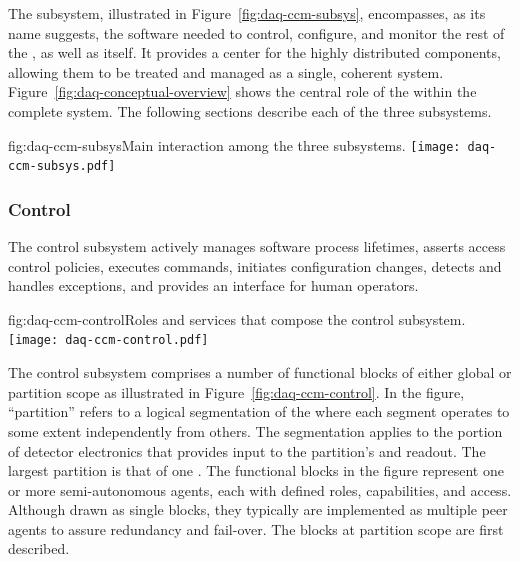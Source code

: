 The  subsystem, illustrated in Figure~\ref{fig:daq-ccm-subsys},
encompasses, as its name suggests, the software needed to control, configure,
and monitor the rest of the , as well as itself. 
It provides a center for the highly distributed  components, allowing
them to be treated and managed as a single, coherent system. 
Figure~\ref{fig:daq-conceptual-overview} shows the central role of the
 within the complete  system.
The following sections describe each of the three  subsystems. 

\begin{dunefigure}{fig:daq-ccm-subsys}{Main interaction among the three  subsystems.}
  \texttt{[image: daq-ccm-subsys.pdf]}
\end{dunefigure}

\subsubsection{Control}
\label{sec:daq:design:ccm:control}


The  control subsystem actively manages  software process
lifetimes, asserts access control policies, executes commands, initiates
configuration changes, detects and handles exceptions, and provides an interface
for human operators.

\begin{dunefigure}{fig:daq-ccm-control}{Roles and services that compose the  control subsystem.}
  \texttt{[image: daq-ccm-control.pdf]}
\end{dunefigure}

The control subsystem comprises a number of functional blocks of either global
or partition scope as illustrated in Figure~\ref{fig:daq-ccm-control}. 
In the figure, ``partition'' refers to a logical segmentation of the 
where each segment operates to some extent independently from others. 
The segmentation applies to the portion of detector electronics that provides
input to the partition's  and readout. 
The largest partition %
is that of one . 
The functional blocks in the figure represent one or more semi-autonomous
agents, each with defined roles, capabilities, and access. 
Although drawn as single blocks, they typically are implemented as multiple peer
agents to assure redundancy and fail-over. 
The blocks at partition scope are first described.

